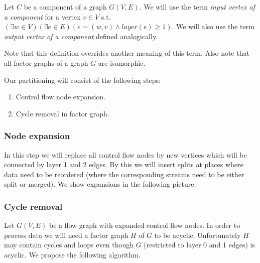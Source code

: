\begin{define}
  Let $C$ be a component of a graph $G(V,E)$. We will use the term \emph{input vertex of a component} for a vertex $v \in V$ s.t. $(\exists w \in V)(\exists e \in E)( e = (w,v) \land layer(e) \geq 1 )$. We will also use the term \emph{output vertex of a component} defined analogically.
\end{define}

Note that this definition overrides another meaning of this term. Also note that all factor graphs of a graph $G$ are isomorphic.

\parspace

Our partitioning will consist of the following steps:
\begin{enumerate}
  \item Control flow node expansion.
  \item Cycle removal in factor graph.
\end{enumerate}

\subsubsection{Node expansion}

In this step we will replace all control flow nodes by new vertices which will be connected by layer 1 and 2 edges. By this we will insert splits at places where data need to be reordered (where the corresponding streams need to be either split or merged). We show expansions in the following picture.


\subsubsection{Cycle removal}

Let $G(V,E)$ be a flow graph with expanded control flow nodes.  In order to process data we will need a factor graph $H$ of $G$ to be acyclic. Unfortunately $H$ may contain cycles and loops even though $G$ (restricted to layer 0 and 1 edges) is acyclic. We propose the following algorithm.

